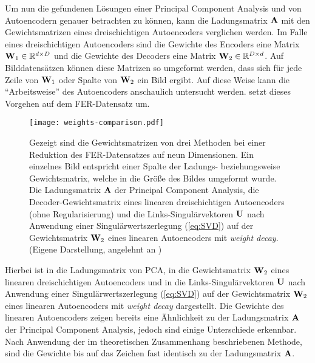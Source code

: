 Um nun die gefundenen Lösungen einer Principal Component Analysis und von Autoencodern genauer
betrachten zu können, kann die Ladungsmatrix $\mathbf{A}$ mit den Gewichtsmatrizen eines
dreischichtigen Autoencoders verglichen werden. Im Falle eines dreischichtigen Autoencoders sind
die Gewichte des Encoders eine Matrix $\mathbf{W}_1 \in \mathbb{R}^{d \times D}$ und die Gewichte des
Decoders eine Matrix $\mathbf{W}_2 \in \mathbb{R}^{D \times d}$. Auf Bilddatensätzen können diese Matrizen
so umgeformt werden, dass sich für jede Zeile von $\mathbf{W}_1$ oder Spalte von $\mathbf{W}_2$ ein Bild
ergibt. Auf diese Weise kann die \enquote{Arbeitsweise} des Autoencoders anschaulich untersucht
werden.  setzt dieses Vorgehen auf dem FER-Datensatz um.
\begin{figure}[ht]
	\centering
	\texttt{[image: weights-comparison.pdf]}
	\caption[Die Gewichtsmatrizen von drei Methoden auf dem FER-Datensatz]{Gezeigt sind die Gewichtsmatrizen von drei Methoden bei einer Reduktion des FER-Datensatzes auf neun Dimensionen. Ein einzelnes Bild entspricht einer Spalte der Ladungs- beziehungsweise Gewichtsmatrix, welche in die Größe des Bildes umgeformt wurde. \captiona Die Ladungsmatrix $\mathbf{A}$ der Principal Component Analysis, \captionb die Decoder-Gewichtsmatrix eines linearen dreischichtigen Autoencoders (ohne Regularisierung) und \captionc die Links-Singulärvektoren $\mathbf{U}$ nach Anwendung einer Singulärwertszerlegung (\eqref{eq:SVD}) auf der Gewichtsmatrix $\mathbf{W}_2$ eines linearen Autoencoders mit \textit{weight decay}. (Eigene Darstellung, angelehnt an \textcite[5]{Plaut.2018})}
	\label{fig:Gewichtsvergleich}
\end{figure}
Hierbei ist in \captiona die Ladungsmatrix von PCA, in \captionb die Gewichtsmatrix $\mathbf{W}_2$ eines linearen dreischichtigen Autoencoders und in \captionc die Links-Singulärvektoren $\mathbf{U}$ nach Anwendung einer Singulärwertszerlegung (\eqref{eq:SVD}) auf der Gewichtsmatrix $\mathbf{W}_2$ eines linearen Autoencoders mit \textit{weight decay} dargestellt. Die Gewichte des linearen Autoencoders zeigen bereits eine Ähnlichkeit zu der Ladungsmatrix $\mathbf{A}$ der Principal Component Analysis, jedoch sind einige Unterschiede erkennbar. Nach Anwendung der im theoretischen Zusammenhang beschriebenen Methode, sind die Gewichte bis auf das Zeichen fast identisch zu der Ladungsmatrix $\mathbf{A}$.